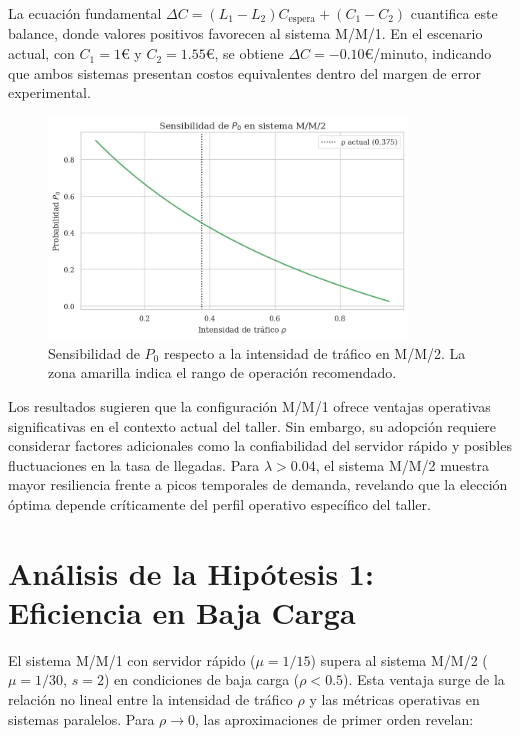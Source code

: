 \documentclass[12pt, a4paper]{article}
\begin{document}
    La ecuación fundamental $\Delta C = (L_1 - L_2)C_{\text{espera}} + (C_1 - C_2)$ cuantifica este balance, donde valores positivos favorecen al sistema M/M/1. En el escenario actual, con $C_1 = 1$€ y $C_2 = 1.55$€, se obtiene $\Delta C = -0.10$€/minuto, indicando que ambos sistemas presentan costos equivalentes dentro del margen de error experimental.
    
    \begin{figure}[H]
    	\centering
    	\includegraphics[width=0.85\textwidth]{figures/sensibilidad_p0.png}
    	\caption{Sensibilidad de $P_0$ respecto a la intensidad de tráfico en M/M/2. La zona amarilla indica el rango de operación recomendado.}
    	\label{fig:sensibilidad}
    \end{figure}
    
    Los resultados sugieren que la configuración M/M/1 ofrece ventajas operativas significativas en el contexto actual del taller. Sin embargo, su adopción requiere considerar factores adicionales como la confiabilidad del servidor rápido y posibles fluctuaciones en la tasa de llegadas. Para $\lambda > 0.04$, el sistema M/M/2 muestra mayor resiliencia frente a picos temporales de demanda, revelando que la elección óptima depende críticamente del perfil operativo específico del taller.
    
    \section{Análisis de la Hipótesis 1: Eficiencia en Baja Carga}
    \label{sec:hipotesis1}
    
    El sistema M/M/1 con servidor rápido ($\mu = 1/15$) supera al sistema M/M/2 ($\mu = 1/30$, $s=2$) en condiciones de baja carga ($\rho < 0.5$). Esta ventaja surge de la relación no lineal entre la intensidad de tráfico $\rho$ y las métricas operativas en sistemas paralelos. Para $\rho \to 0$, las aproximaciones de primer orden revelan:
    
\end{document}
